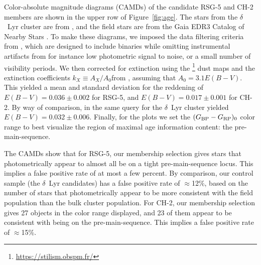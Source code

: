 \documentclass[12pt,twocolumn,linenumbers]{aastex63}
\newcommand{\bpmrpo}{(G_{\rm BP}-G_{\rm RP})_0}
\begin{document}
Color-absolute magnitude diagrams (CAMDs) of the candidate RSG-5 and
CH-2 members are shown in the upper row of Figure~\ref{fig:age}.  The
stars from the $\delta$~Lyr cluster are from
\citet{bouma_kep1627_2022}, and the field stars are from the Gaia EDR3
Catalog of Nearby Stars \citep{gaia_gcns_2021}.  To make these
diagrams, we imposed the data filtering criteria from
\citet[][Appendix B]{GaiaCollaboration2018}, which are designed to
include binaries while omitting instrumental artifacts from for
instance low photometric signal to noise, or a small number of
visibility periods.  We then corrected for extinction using the
\citet{lallement_threedimensional_2018}\footnote{\url{https://stilism.obspm.fr/}}
dust maps and the extinction coefficients $k_X\equiv A_X/A_0$from
\citet{GaiaCollaboration2018}, assuming that $A_0 = 3.1 E(B-V)$.  This
yielded a mean and standard deviation for the reddening of
$E(B-V)=0.036\pm0.002$ for RSG-5, and $E(B-V)=0.017\pm0.001$
for CH-2.  By way of comparison, in \citet{bouma_kep1627_2022} the
same query for the $\delta$~Lyr cluster yielded
$E(B-V)=0.032\pm0.006$.  Finally, for the plots we set the $\bpmrpo$
color range to best visualize the region of maximal age information
content: the pre-main-sequence.

The CAMDs show that for RSG-5, our membership selection gives stars
that photometrically appear to almost all be on a tight
pre-main-sequence locus.  This implies a false positive rate of at
most a few percent.  By comparison, our control sample (the $\delta$~Lyr
candidates) has a false positive rate of $\approx$12\%, based on the
number of stars that photometrically appear to be more consistent with
the field population than the bulk cluster population.  For CH-2, our
membership selection gives 27 objects in the color range displayed,
and 23 of them appear to be consistent with being on the
pre-main-sequence.  This implies a false positive rate of
$\approx$15\%.
\end{document}
